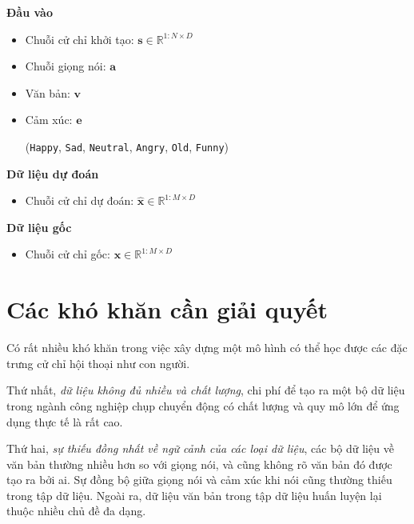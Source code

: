 \begin{multicols}{2}
	
\textbf{Đầu vào}

\begin{itemize}
	\item Chuỗi cử chỉ khởi tạo: $\mathbf{s} \in \mathbb{R}^{1:N \times D}$
	\item Chuỗi giọng nói: $\mathbf{a}$
	\item Văn bản: $\mathbf{v}$ 
	\item Cảm xúc: $\mathbf{e}$ 
	
	{\small
		(\texttt{Happy},  \texttt{Sad},  \texttt{Neutral}, \texttt{Angry}, \texttt{Old}, \texttt{Funny})
	}
\end{itemize}

\columnbreak

\textbf{Dữ liệu dự đoán}
\vspace{-10pt}
\begin{itemize}
	\item Chuỗi cử chỉ dự đoán: $\hat{\mathbf{x}} \in \mathbb{R}^{1:M \times D}$
\end{itemize}

\textbf{Dữ liệu gốc}
\vspace{-10pt}
\begin{itemize}
	\item Chuỗi cử chỉ gốc: $ \mathbf{x}  \in \mathbb{R}^{1:M \times D}$
\end{itemize}

\end{multicols}

\section{Các khó khăn cần giải quyết}
\label{sec:difficult}

Có rất nhiều khó khăn trong việc xây dựng một mô hình có thể học được các đặc trưng cử chỉ hội thoại như con người.

Thứ nhất, \textit{dữ liệu không đủ nhiều và chất lượng}, chi phí để tạo ra một bộ dữ liệu trong ngành công nghiệp chụp chuyển động có chất lượng và quy mô lớn để ứng dụng thực tế là rất cao.

Thứ hai, \textit{sự thiếu đồng nhất về ngữ cảnh của các loại dữ liệu}, các bộ dữ liệu về văn bản thường nhiều hơn so với giọng nói, và cũng không rõ văn bản đó được tạo ra bởi ai. Sự đồng bộ giữa giọng nói và cảm xúc khi nói cũng thường thiếu trong tập dữ liệu. Ngoài ra, dữ liệu văn bản trong tập dữ liệu huấn luyện lại thuộc nhiều chủ đề đa dạng.
 
